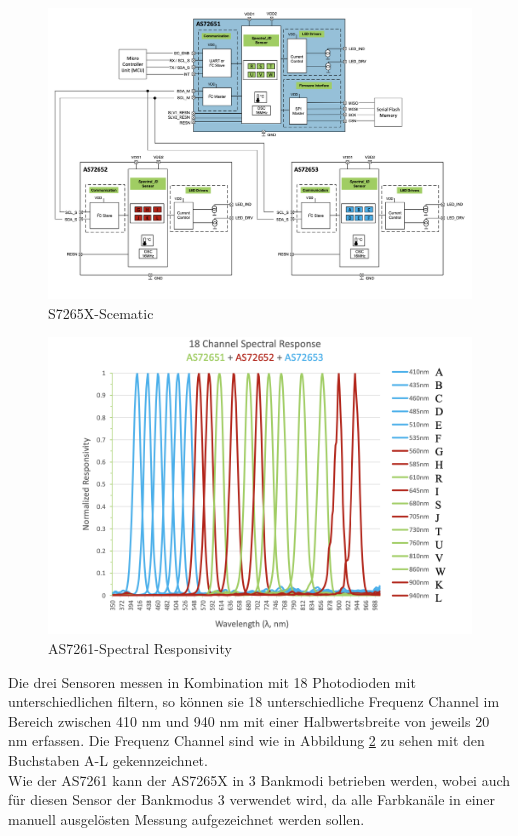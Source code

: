 \begin{figure}[H]
  \centering
 \includegraphics[width=0.9\linewidth]{img/AS7265X-Scematic.png}
 \caption{S7265X-Scematic\cite{Datenblatt_AS7265X}}
  \label{fig:S7265X-Scematic}
\end{figure}


\begin{figure}[H]
  \centering
 \includegraphics[width=0.9\linewidth]{img/AS7265X-Spectral_Responsivity.png}
 \caption{AS7261-Spectral Responsivity \cite{Datenblatt_AS7265X}}
  \label{fig:AS7261-Spectral_Responsivity}
\end{figure}

\noindent Die drei Sensoren messen in Kombination mit 18  Photodioden mit unterschiedlichen filtern, so können sie 18 unterschiedliche Frequenz Channel im Bereich zwischen 410 nm und 940 nm mit einer Halbwertsbreite von jeweils 20 nm erfassen.
Die Frequenz Channel sind wie in Abbildung \ref{fig:AS7261-Spectral_Responsivity} zu sehen mit den Buchstaben A-L gekennzeichnet.\\
Wie der AS7261 kann der AS7265X in 3 Bankmodi betrieben werden, wobei auch für diesen Sensor der Bankmodus 3 verwendet wird, da alle Farbkanäle in einer manuell ausgelösten Messung aufgezeichnet werden sollen.

